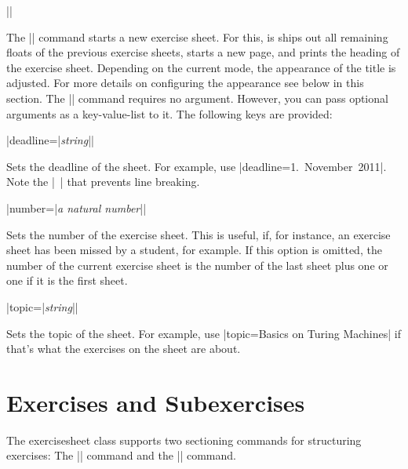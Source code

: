 \documentclass[a4paper,fleqn]{report}
\def\exercisesheet{{exercisesheet}}
\def\syntaxdefaultarg#1{\hfill\texttt{\small #1}\par\smallskip\noindent\ignorespaces}
\def\metaargument#1{\textit{\small #1}}
\begin{document}
\begin{syntax}

  |\sheet[|\metaargument{key-value-list}|]| \syntaxdefaultarg{} The
  |\sheet| command starts a new exercise sheet. For this, is ships out
  all remaining floats of the previous exercise sheets, starts a new
  page, and prints the heading of the exercise sheet. Depending on the
  current mode, the appearance of the title is adjusted. For more
  details on configuring the appearance see below in this section.
  The |\sheet| command requires no argument. However, you can pass
  optional arguments as a key-value-list to it. The following keys are
  provided:
  \begin{syntax}
    |deadline={|\metaargument{string}|}| \syntaxdefaultarg{}
    Sets the deadline of the sheet. For example, use 
    |deadline={1.~November~2011}|. Note the |~| that prevents line
    breaking.
  \end{syntax}
  \begin{syntax}
    |number={|\metaargument{a natural number}|}| \syntaxdefaultarg{}
    Sets the number of the exercise sheet. This is useful, if, for
    instance, an exercise sheet has been missed by a student, for
    example. If this option is omitted, the number of the current
    exercise sheet is the number of the last sheet plus one or one if
    it is the first sheet.
  \end{syntax}
  \begin{syntax}
    |topic={|\metaargument{string}|}| \syntaxdefaultarg{}
    Sets the topic of the sheet. For example, use 
    |topic={Basics on Turing Machines}| if that's what the exercises
    on the sheet are about.
  \end{syntax}
\end{syntax}


\section{Exercises and Subexercises}

The \exercisesheet{} class supports two sectioning commands for
structuring exercises: The |\exercise| command and the |\subexercise|
command.
\end{document}
